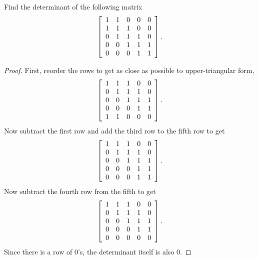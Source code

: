 \documentclass{tutorial}
\begin{document}
\begin{prob}[Determinants] Find the determinant of the following matrix
\[
  \left[ \begin{array}{ccccc}
    1&1&0&0&0\\
    1&1&1&0&0\\
    0&1&1&1&0\\
    0&0&1&1&1\\
    0&0&0&1&1
  \end{array} \right] .
\]
\end{prob} \ifsolns \begin{proof}
First, reorder the rows to get as close as possible to upper-triangular form,
\[
  \left[ \begin{array}{ccccc}
    1&1&1&0&0\\
    0&1&1&1&0\\
    0&0&1&1&1\\
    0&0&0&1&1\\
    1&1&0&0&0
  \end{array} \right] .
\]
Now subtract the first row and add the third row to the fifth row to get
\[
  \left[ \begin{array}{ccccc}
    1&1&1&0&0\\
    0&1&1&1&0\\
    0&0&1&1&1\\
    0&0&0&1&1\\
    0&0&0&1&1
  \end{array} \right] .
\]
Now subtract the fourth row from the fifth to get
\[
  \left[ \begin{array}{ccccc}
    1&1&1&0&0\\
    0&1&1&1&0\\
    0&0&1&1&1\\
    0&0&0&1&1\\
    0&0&0&0&0
  \end{array} \right] .
\]
Since there is a row of $0$'s, the determinant itself is also $0$.
\end{proof}\else \newpage \fi
\end{document}
